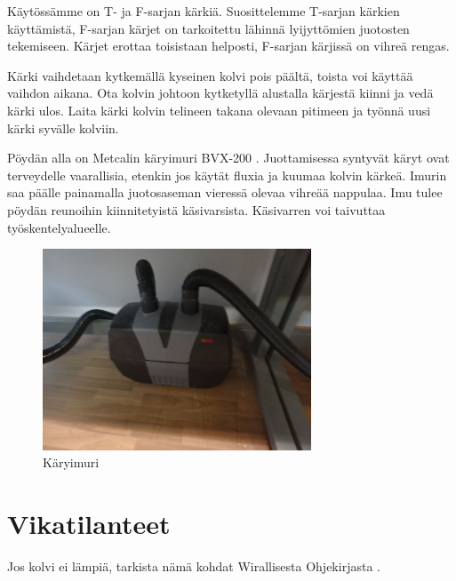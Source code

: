 \documentclass[pdftex,a4paper]{article}
\begin{document}
K\"ayt\"oss\"amme on T- ja F-sarjan k\"arki\"a. Suosittelemme T-sarjan k\"arkien k\"aytt\"amist\"a, F-sarjan k\"arjet on tarkoitettu l\"ahinn\"a lyijytt\"omien juotosten tekemiseen. K\"arjet erottaa toisistaan helposti, F-sarjan k\"arjiss\"a on vihre\"a rengas. 

K\"arki vaihdetaan kytkem\"all\"a kyseinen kolvi pois p\"a\"alt\"a, toista voi k\"aytt\"a\"a vaihdon aikana. Ota kolvin johtoon kytketyll\"a alustalla k\"arjest\"a kiinni ja ved\"a k\"arki ulos. Laita k\"arki kolvin telineen takana olevaan pitimeen ja ty\"onn\"a uusi k\"arki syv\"alle kolviin.

P\"oyd\"an alla on Metcalin k\"aryimuri BVX-200 \cite{MetcalBVX200}. Juottamisessa syntyv\"at k\"aryt ovat terveydelle vaarallisia, etenkin jos k\"ayt\"at fluxia ja kuumaa kolvin k\"arke\"a. Imurin saa p\"a\"alle painamalla juotosaseman vieress\"a olevaa vihre\"a\"a nappulaa. Imu tulee p\"oyd\"an reunoihin kiinnitetyist\"a k\"asivarsista. K\"asivarren voi taivuttaa ty\"oskentelyalueelle. 

\begin{figure}[htb]
  \begin{center}
    \includegraphics[height=6cm]{images/bvx200.jpg}
  \end{center}
  \caption{\label{img:fume_extractor} K\"aryimuri}
\end{figure}

\section{Vikatilanteet}
Jos kolvi ei l\"ampi\"a, tarkista n\"am\"a kohdat Wirallisesta Ohjekirjasta \cite[p. 3]{MetcalInstructions}. 
\end{document}
